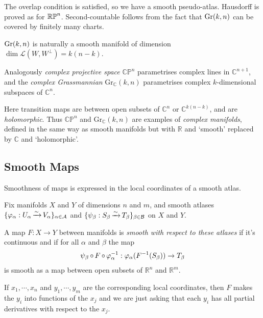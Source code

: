 \documentclass[a4paper,11pt]{article}
\begin{document}
	The overlap condition is satisfied, so we have a smooth pseudo-atlas. Hausdorff is proved as for $\mathbb{RP}^{n}$. Second-countable follows from the fact that $\mathrm{Gr}({k},{n})$ can be covered by finitely many charts.

	\begin{prop}
		$\mathrm{Gr}({k},{n})$ is naturally a smooth manifold of dimension\\ $\dim \mathcal{L}(W,W^\perp) = k(n-k)$. 
	\end{prop}

	\begin{rmk}
		Analogously \emph{complex projective space} $\mathbb{CP}^n$ parametrises complex lines in $\mathbb{C}^{n+1}$, and the \emph{complex Grassmannian} $\mathrm{Gr}_{\mathbb{C}}(k,n)$ parametrises complex $k$-dimensional subspaces of $\mathbb{C}^n$.
	\end{rmk}

	Here transition maps are between open subsets of $\mathbb{C}^n$ or $\mathbb{C}^{k(n-k)}$, and are \emph{holomorphic}. Thus $\mathbb{CP}^n$ and $\mathrm{Gr}_{\mathbb{C}}(k,n)$ are examples of \emph{complex manifolds}, defined in the same way as smooth manifolds but with $\mathbb{R}$ and `smooth' replaced by $\mathbb{C}$ and `holomorphic'.

	\subsection{Smooth Maps} 

	Smoothness of maps is expressed in the local coordinates of a smooth atlas.

	Fix manifolds $X$ and $Y$ of dimensions $n$ and $m$, and smooth atlases $\{\varphi_\alpha : U_\alpha \operatorname{\xrightarrow{\sim}} V_\alpha\}_{\alpha \in \mathcal{A}}$ and $\{\psi_\beta : S_\beta \operatorname{\xrightarrow{\sim}} T_\beta\}_{\beta \in \mathcal{B}}$ on $X$ and $Y$.
	
	\begin{defi}
		A map $F : X \to Y$ between manifolds is \emph{smooth with respect to these atlases} if it's continuous and if for all $\alpha$ and $\beta$ the map
		\[
			\psi_\beta \operatorname{\circ} F \operatorname{\circ} \varphi_\alpha^{-1} : \varphi_\alpha (F^{-1} (S_\beta)) \to T_\beta
		\]
		is smooth as a map between open subsets of $\mathbb{R}^n$ and $\mathbb{R}^m$.
	\end{defi}

	If $x_1, \cdots, x_n$ and $y_1, \cdots, y_m$ are the corresponding local coordinates, then $F$ makes the $y_i$ into functions of the $x_j$ and we are just asking that each $y_i$ has all partial derivatives with respect to the $x_j$.
\end{document}
